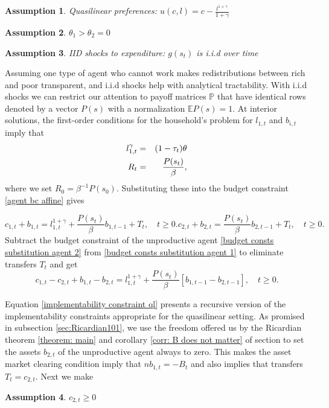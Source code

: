 \documentclass[thmsb,11pt]{article}
\newtheorem{assumption}{Assumption}
\begin{document}
\begin{assumption}
\label{ass quasilinear}
Quasilinear preferences: $u(c,l)=c-\frac{l^{1+\gamma}}{1+\gamma}$
\end{assumption}
\begin{assumption}
 $\theta_1>\theta_2=0$
\end{assumption}
\begin{assumption}
\label{ass iid}
IID shocks to expenditure: $g(s_t)$ is i.i.d over time
\end{assumption}
Assuming one type of agent who cannot work makes  redistributions between rich and poor transparent, and i.i.d shocks help with analytical tractability.  With i.i.d shocks we can restrict our attention to  payoff matrices $\mathbb{P}$ that have identical rows denoted by a vector $P(s)$ with a normalization  $\mathbb{E}P(s)=1$. At interior solutions, the first-order conditions for the household's problem for $l_{1,t}$ and $b_{i,t}$ imply that
\begin{eqnarray*}
l_{1,t}^\gamma & = &(1-\tau_t) \theta \cr
R_t & = & \frac{P(s_t)}{\beta},
\end{eqnarray*}
where we set  $R_{0}=\beta^{-1} P(s_0)$.
Substituting these into the  budget constraint \eqref{agent bc affine} gives %

 \begin{subequations}
 \begin{equation} \label{budget consts substitution agent 1} c_{1,t} + b_{1,t} = l_{1,t}^{1+\gamma} + \frac{P(s_t)}{\beta} b_{1,t-1}+T_t, \quad t \geq 0.
 \end{equation}

 \begin{equation} \label{budget consts substitution agent 2} c_{2,t} + b_{2,t} =  \frac{P(s_t)}{\beta} b_{2,t-1}+T_t, \quad t \geq 0.
 \end{equation}
\end{subequations}
Subtract the budget constraint of the unproductive agent \eqref{budget consts substitution agent 2} from \eqref{budget consts substitution agent 1} to eliminate transfers $T_t$
and get 
 \begin{equation} \label{implementability constraint ql} c_{1,t} -c_{2,t} + b_{1,t}-b_{2,t} = l_{1,t}^{1+\gamma} + \frac{P(s_t)}{\beta} [b_{1,t-1}-b_{2,t-1}], \quad t \geq 0.
 \end{equation}
 
 Equation \eqref{implementability constraint ql} presents a recursive version of the implementability constraints appropriate for the quasilinear setting.
 As promised in subsection \ref{sec:Ricardian101},
 we use the freedom offered us by the Ricardian theorem \ref{theorem: main} and corollary \ref{corr: B does not matter}
of  section  to  set the assets $b_{2,t}$ of the unproductive agent  always to
zero. This makes the asset market clearing condition imply  that   $nb_{1,t} = -B_t$ and
also implies that  transfers  $T_t=c_{2,t}$. Next we make
\begin{assumption}
\label{ass non negativity}
$c_{2,t}\geq0$
\end{assumption}
\end{document}
